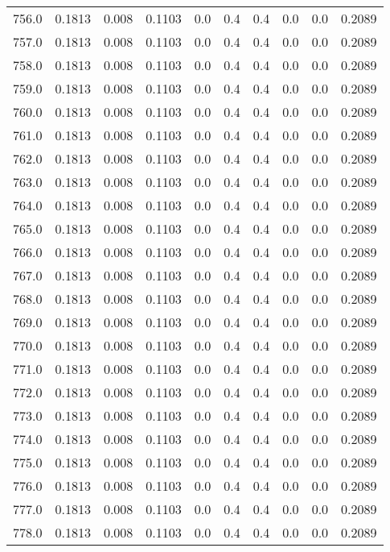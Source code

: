 \begin{longtable}{lrrrrrrrrr}
756.0 & 0.1813 & 0.008 & 0.1103 & 0.0 & 0.4 & 0.4 & 0.0 & 0.0 & 0.2089 \\
757.0 & 0.1813 & 0.008 & 0.1103 & 0.0 & 0.4 & 0.4 & 0.0 & 0.0 & 0.2089 \\
758.0 & 0.1813 & 0.008 & 0.1103 & 0.0 & 0.4 & 0.4 & 0.0 & 0.0 & 0.2089 \\
759.0 & 0.1813 & 0.008 & 0.1103 & 0.0 & 0.4 & 0.4 & 0.0 & 0.0 & 0.2089 \\
760.0 & 0.1813 & 0.008 & 0.1103 & 0.0 & 0.4 & 0.4 & 0.0 & 0.0 & 0.2089 \\
761.0 & 0.1813 & 0.008 & 0.1103 & 0.0 & 0.4 & 0.4 & 0.0 & 0.0 & 0.2089 \\
762.0 & 0.1813 & 0.008 & 0.1103 & 0.0 & 0.4 & 0.4 & 0.0 & 0.0 & 0.2089 \\
763.0 & 0.1813 & 0.008 & 0.1103 & 0.0 & 0.4 & 0.4 & 0.0 & 0.0 & 0.2089 \\
764.0 & 0.1813 & 0.008 & 0.1103 & 0.0 & 0.4 & 0.4 & 0.0 & 0.0 & 0.2089 \\
765.0 & 0.1813 & 0.008 & 0.1103 & 0.0 & 0.4 & 0.4 & 0.0 & 0.0 & 0.2089 \\
766.0 & 0.1813 & 0.008 & 0.1103 & 0.0 & 0.4 & 0.4 & 0.0 & 0.0 & 0.2089 \\
767.0 & 0.1813 & 0.008 & 0.1103 & 0.0 & 0.4 & 0.4 & 0.0 & 0.0 & 0.2089 \\
768.0 & 0.1813 & 0.008 & 0.1103 & 0.0 & 0.4 & 0.4 & 0.0 & 0.0 & 0.2089 \\
769.0 & 0.1813 & 0.008 & 0.1103 & 0.0 & 0.4 & 0.4 & 0.0 & 0.0 & 0.2089 \\
770.0 & 0.1813 & 0.008 & 0.1103 & 0.0 & 0.4 & 0.4 & 0.0 & 0.0 & 0.2089 \\
771.0 & 0.1813 & 0.008 & 0.1103 & 0.0 & 0.4 & 0.4 & 0.0 & 0.0 & 0.2089 \\
772.0 & 0.1813 & 0.008 & 0.1103 & 0.0 & 0.4 & 0.4 & 0.0 & 0.0 & 0.2089 \\
773.0 & 0.1813 & 0.008 & 0.1103 & 0.0 & 0.4 & 0.4 & 0.0 & 0.0 & 0.2089 \\
774.0 & 0.1813 & 0.008 & 0.1103 & 0.0 & 0.4 & 0.4 & 0.0 & 0.0 & 0.2089 \\
775.0 & 0.1813 & 0.008 & 0.1103 & 0.0 & 0.4 & 0.4 & 0.0 & 0.0 & 0.2089 \\
776.0 & 0.1813 & 0.008 & 0.1103 & 0.0 & 0.4 & 0.4 & 0.0 & 0.0 & 0.2089 \\
777.0 & 0.1813 & 0.008 & 0.1103 & 0.0 & 0.4 & 0.4 & 0.0 & 0.0 & 0.2089 \\
778.0 & 0.1813 & 0.008 & 0.1103 & 0.0 & 0.4 & 0.4 & 0.0 & 0.0 & 0.2089 \\

\end{longtable}
